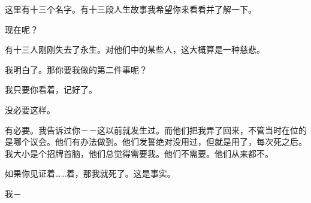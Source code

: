 
这里有十三个名字。有十三段人生故事我希望你来看看并了解一下。


现在呢？

有十三人刚刚失去了永生。对他们中的某些人，这大概算是一种慈悲。

我明白了。那你要我做的第二件事呢？


我只要你看着，记好了。


没必要这样。

有必要。我告诉过你－－这以前就发生过。而他们把我弄了回来，不管当时在位的是哪个议会。他们有办法做到。他们发誓绝对没用过，但就是用了，每次死之后。我大小是个招牌首脑，他们总觉得需要我。他们不需要。他们从来都不。


如果你见证着……着，那我就死了。这是事实。


我－


\hr

\hr

\hr

\begin{scpbox}


\end{scpbox}


\begin{scpbox}


\end{scpbox}

\begin{scpbox}


\end{scpbox}

